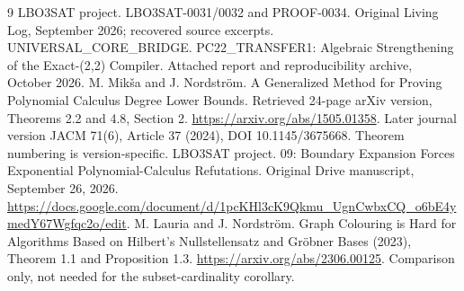 \documentclass[11pt]{article}
\begin{document}
\begin{thebibliography}{9}
 LBO3SAT project. LBO3SAT-0031/0032 and PROOF-0034. Original Living Log, September 2026; recovered source excerpts.
 UNIVERSAL\_CORE\_BRIDGE. PC22\_TRANSFER1: Algebraic Strengthening of the Exact-(2,2) Compiler. Attached report and reproducibility archive, October 2026.
 M. Mik\v{s}a and J. Nordstr\"om. A Generalized Method for Proving Polynomial Calculus Degree Lower Bounds. Retrieved 24-page arXiv version, Theorems 2.2 and 4.8, Section 2. \url{https://arxiv.org/abs/1505.01358}. Later journal version JACM 71(6), Article 37 (2024), DOI 10.1145/3675668. Theorem numbering is version-specific.
 LBO3SAT project. 09: Boundary Expansion Forces Exponential Polynomial-Calculus Refutations. Original Drive manuscript, September 26, 2026. \url{https://docs.google.com/document/d/1pcKHl3cK9Qkmu_UgnCwbxCQ_o6bE4ymedY67Wgfqc2o/edit}.
 M. Lauria and J. Nordstr\"om. Graph Colouring is Hard for Algorithms Based on Hilbert's Nullstellensatz and Gr\"obner Bases (2023), Theorem 1.1 and Proposition 1.3. \url{https://arxiv.org/abs/2306.00125}. Comparison only, not needed for the subset-cardinality corollary.
\end{thebibliography}
\end{document}

